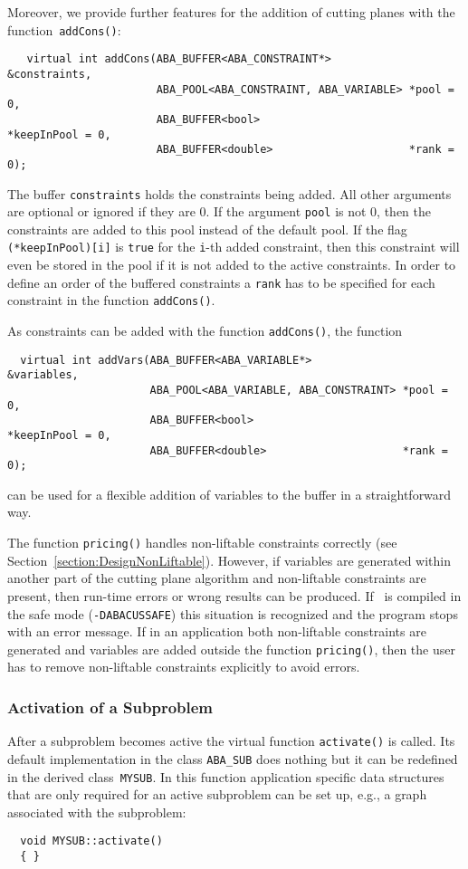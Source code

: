 Moreover, we provide further features for the addition of cutting planes
with the function~{\tt addCons()}:
\begin{verbatim}
   virtual int addCons(ABA_BUFFER<ABA_CONSTRAINT*>            &constraints,
                       ABA_POOL<ABA_CONSTRAINT, ABA_VARIABLE> *pool = 0,
                       ABA_BUFFER<bool>                       *keepInPool = 0,
                       ABA_BUFFER<double>                     *rank = 0);
\end{verbatim}
The buffer {\tt constraints} holds the constraints being added. All
other arguments are optional or ignored if they are 0. If the argument
{\tt pool} is not 0, then the constraints are added to this pool instead
of the default pool. If the flag {\tt (*keepInPool)[i]}
is {\tt true} for the {\tt i}-th added constraint, then this constraint
will even be stored in the pool if it is not added to the active constraints.
In order to define
an order of the buffered constraints a {\tt rank} has to be specified
for each constraint in the function {\tt addCons()}.

As constraints can be added with the function {\tt addCons()},
the function 
\begin{verbatim}
  virtual int addVars(ABA_BUFFER<ABA_VARIABLE*>              &variables,
                      ABA_POOL<ABA_VARIABLE, ABA_CONSTRAINT> *pool = 0,
                      ABA_BUFFER<bool>                       *keepInPool = 0,
                      ABA_BUFFER<double>                     *rank = 0);
\end{verbatim}
can be used for a flexible addition of variables to the buffer in a 
straightforward way.

The function {\tt pricing()} handles non-liftable constraints correctly
(see Section~\ref{section:DesignNonLiftable}). 
However, if variables are generated within another
part of the cutting plane algorithm and non-liftable constraints are
present, then run-time errors or wrong results can be produced. 
If \ABACUS\ is compiled in the safe mode ({\tt -DABACUSSAFE}) this
situation is recognized and the program stops with an error message.
If in an application both non-liftable constraints are generated
and variables are added outside the function {\tt pricing()}, then
the user has to remove non-liftable constraints explicitly to avoid
errors.

\subsubsection{Activation of a Subproblem}
\noindent
After a subproblem becomes active the virtual function {\tt activate()} is
called. Its default implementation in the class {\tt ABA\_SUB} does nothing
but it can be redefined in the derived class~{\tt MYSUB}. In this
function application specific data structures that are only required
for an active subproblem can be set up, e.g., a graph associated with the
subproblem:
\begin{verbatim}
  void MYSUB::activate()
  { }
\end{verbatim}


